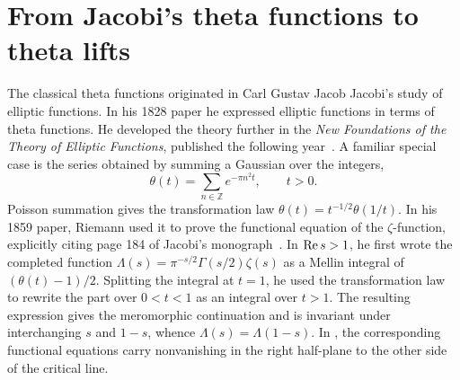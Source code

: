 \section*{From Jacobi's theta functions to theta lifts}

The classical theta functions originated in Carl Gustav Jacob Jacobi's study of elliptic functions. In his 1828 paper he expressed elliptic functions in terms of theta functions. He developed the theory further in the \emph{New Foundations of the Theory of Elliptic Functions}, published the following year~\cite{Jacobi1828,Jacobi1829}. A familiar special case is the series obtained by summing a Gaussian over the integers,
\[
  \theta(t)=\sum_{n\in\mathbb Z} e^{-\pi n^2t},
  \qquad t>0.
\]
Poisson summation gives the transformation law $\theta(t)=t^{-1/2}\theta(1/t)$. In his 1859 paper, Riemann used it to prove the functional equation of the $\zeta$-function, explicitly citing page 184 of Jacobi's monograph~\cite{Riemann1859,Jacobi1829}. In $\operatorname{Re} s>1$, he first wrote the completed function $\Lambda(s)=\pi^{-s/2}\Gamma(s/2)\zeta(s)$ as a Mellin integral of $(\theta(t)-1)/2$. Splitting the integral at $t=1$, he used the transformation law to rewrite the part over $0<t<1$ as an integral over $t>1$. The resulting expression gives the meromorphic continuation and is invariant under interchanging $s$ and $1-s$, whence $\Lambda(s)=\Lambda(1-s)$. In , the corresponding functional equations carry nonvanishing in the right half-plane to the other side of the critical line.

